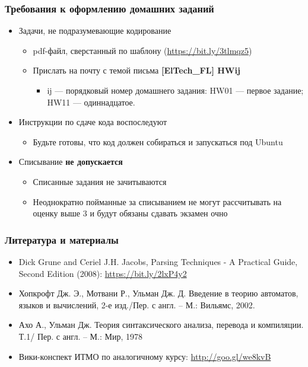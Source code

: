 \documentclass{beamer}
\begin{document}
\begin{frame}[fragile]
  \transwipe[direction=90]
  \frametitle{Требования к оформлению домашних заданий}
  \begin{itemize}
    \item Задачи, не подразумевающие кодирование
    \begin{itemize}
      \item pdf-файл, сверстанный по
шаблону (\url{https://bit.ly/3tlmqz5})
      \item Прислать на почту с темой письма \textbf{[ElTech\_FL] HWij}
      \begin{itemize}
        \item ij --- порядковый номер домашнего задания: HW01 --- первое задание; HW11 --- одиннадцатое.
      \end{itemize}
    \end{itemize}
    \item Инструкции по сдаче кода воспоследуют
    \begin{itemize}
      \item Будьте готовы, что код должен собираться и запускаться под Ubuntu
    \end{itemize}
    \item Списывание \textbf{не допускается}
    \begin{itemize}
      \item Списанные задания не зачитываются
      \item Неоднократно пойманные за списыванием не могут рассчитывать на оценку выше 3 и будут обязаны сдавать экзамен очно
    \end{itemize}
  \end{itemize}
\end{frame}

\begin{frame}[fragile]
  \transwipe[direction=90]
  \frametitle{Литература и материалы}
  \begin{itemize}
    \item Dick Grune and Ceriel J.H. Jacobs, Parsing Techniques - A Practical Guide, Second Edition (2008): \url{https://bit.ly/2lxP4y2}
    \item Хопкрофт Дж. Э., Мотвани Р., Ульман Дж. Д. Введение в теорию автоматов, языков и вычислений, 2-е изд./Пер. с англ. – М.: Вильямс, 2002.
    \item Ахо А., Ульман Дж. Теория синтаксического анализа, перевода и компиляции. Т.1/ Пер. с англ. – М.: Мир, 1978
    \item Вики-конспект ИТМО по аналогичному курсу: \url{http://goo.gl/we8kvB}
  \end{itemize}
\end{frame}
\end{document}
